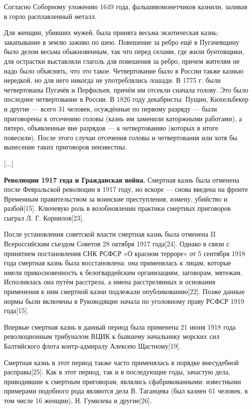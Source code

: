 Согласно Соборному уложению 1649 года, фальшивомонетчиков казнили, заливая в горло расплавленный металл.

Для женщин, убивших мужей, была принята весьма экзотическая казнь: закапывание в землю заживо по шею. Повешение за ребро ещё в Пугачевщину было делом весьма обыкновенным, так что перед селами, где жили бунтовщики, для острастки выставляли глаголь для повешения за ребро, причем жителям не надо было объяснять, что это такое. Четвертование было в России также казнью нередкой, но для него никогда не употреблялись лошади. В 1775 г. были четвертованы Пугачёв и Перфильев, причём им отсекли сначала голову. Это было последнее четвертование в России. В 1826 году декабристы: Пущин, Кюхельбекер и другие — всего 31 человек, осуждённые по первому разряду — были приговорены к отсечению головы (казнь им заменили каторжными работами), а пятеро, объявленные вне разрядов — к четвертованию (которых в итоге повесили). После этого случаи отсечения головы и четвертования или хотя бы вынесение таких приговоров неизвестны.

[...]

\textbf{Революции 1917 года и Гражданская война.} Смертная казнь была отменена после Февральской революции в 1917 году, но вскоре — снова введена на фронте Временным правительством за воинские преступления, измену, убийство и разбой[15]. Ключевую роль в возобновлении практики смертных приговоров сыграл Л. Г. Корнилов[23].

После установления советской власти смертная казнь была отменена II Всероссийским съездом Советов 28 октября 1917 года[24]. Однако в связи с принятием постановления СНК РСФСР «О красном терроре» от 5 сентября 1918 года смертная казнь была восстановлена: она применялась к лицам, которые имели прикосновенность к белогвардейским организациям, заговорам, мятежам. Исполнялась она путём расстрела, а имена расстрелянных и основания применения к ним смертной казни подлежали опубликованию[22]. Позже данные нормы были включены в Руководящие начала по уголовному праву РСФСР 1919 года[15].

Впервые смертная казнь в данный период была применена 21 июня 1918 года революционным трибуналом ВЦИК к бывшему начальнику морских сил Балтийского флота контр-адмиралу Алексею Щастному[19].

Смертная казнь в этот период также часто применялась в порядке внесудебной расправы[25]. Как в этот период, так и в последующие годы, зачастую дела, приводившие к смертным приговорам, являлись сфабрикованными: известными примерами подобного рода являются дела В. Таганцева (был казнен 61 человек, в том числе 16 женщин), Н. Гумилева и другие[26].

